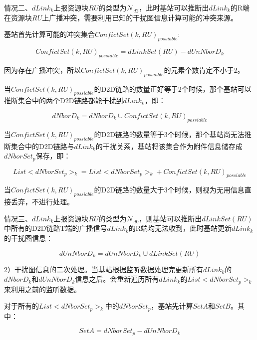\documentclass[figurelist,tablelist,algorithmlist,nomlist,masters]{seuthesix}
\begin{document}
	
	情况二、$dLink_k$上报资源块$RU$的类型为$\mathcal{N}_{d2}$，此时基站可以推断出$dLink_k$的R端在资源块$RU$上广播冲突，需要利用已知的干扰图信息计算可能的冲突来源。
	
	基站首先计算可能的冲突集合$ConfictSet{(k,RU)_{possiable}}$:
	
	\begin{equation}\label{eq2.14}
	ConfictSet{(k,RU)_{possiable}} = dLinkSet(RU) - dUnNborD_k
	\end{equation}
	
	因为存在广播冲突，所以$ConfictSet{(k,RU)_{possiable}}$的元素个数肯定不小于2。
	
	当$ConfictSet{(k,RU)_{possiable}}$的D2D链路的数量正好等于2个时候，那个基站可以推断集合中的两个D2D链路都能干扰到$dLink_k$，即：
	
	\begin{equation}\label{eq2.15}
	dNborD_k = dNborD_k \cup ConfictSet{(k,RU)_{possiable}}
	\end{equation}
	
	当$ConfictSet{(k,RU)_{possiable}}$的D2D链路的数量等于3个时候，那个基站尚无法推断集合中的D2D链路与$dLink_k$的干扰关系，基站将该集合作为附件信息储存成$dNborSet_{p}$保存，即：
	
	\begin{equation}\label{eq2.16}
	List < dNborSet_{p}{ > _k} = List < dNborSet_{p}{ > _k} + ConfictSet{(k,RU)_{possiable}}
	\end{equation}
	
	当$ConfictSet{(k,RU)_{possiable}}$的D2D链路的数量大于3个时候，则视为无用信息直接丢弃，不进行处理。
	
	
	情况三、$dLink_k$上报资源块$RU$的类型为$\mathcal{N}_{d0}$，则基站可以推断出$dLinkSet(RU)$中所有的D2D链路T端的广播信号$dLink_k$的R端均无法收到，此时基站更新$dLink_k$的干扰图信息：
	
	\begin{equation}\label{eq2.17}
	dUnNborD_k = dUnNborD_k \cup dLinkSet(RU)
	\end{equation}
	
	2）干扰图信息的二次处理。当基站根据监听数据处理完更新所有$dLink_k$的$dNborD_k$和$dUnNborD_k$信息之后。会重新遍历所有$dLink_k$的$List < dNborSet_{p}{ > _k}$来利用之前的监听数据。
	
	对于所有的$List < dNborSet_{p}{ > _k}$中的$dNborSet_{p}$，基站先计算$SetA$和$SetB$。其中：
	
	\begin{equation}\label{eq2.18}
	SetA = dNborSet_{p} - dUnNborD_k
	\end{equation}
	
\end{document}
